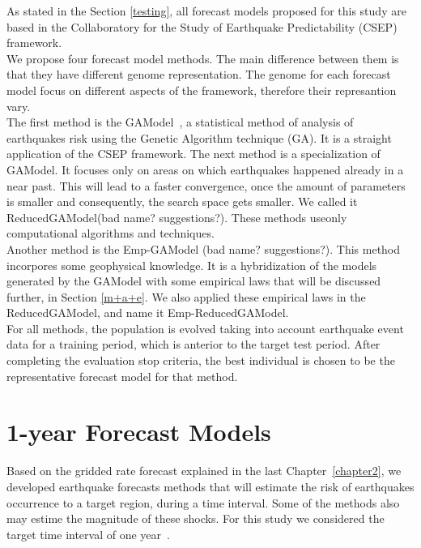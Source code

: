 As stated in the Section \ref{testing}, all forecast models proposed for this study are based in the Collaboratory for the Study of Earthquake Predictability (CSEP) framework.\\

We propose four forecast model methods. The main difference between them is that they have different genome representation. The genome for each forecast model focus on different aspects of the framework, therefore their represantion vary.\\

The first method is the GAModel~\cite{ecta14}, a statistical method of analysis of
earthquakes risk using the Genetic Algorithm technique (GA). It is a straight application of the CSEP framework. The next method is a specialization of GAModel. It focuses only on areas on which earthquakes happened already in a near past. This will lead to a faster convergence, once the amount of parameters is smaller and consequently, the search space gets smaller. We called it ReducedGAModel(bad name? suggestions?). These methods useonly computational algorithms and techniques.\\

Another method is the Emp-GAModel (bad name? suggestions?). This method incorpores some
geophysical knowledge. It is a hybridization of the models generated by the GAModel with some empirical laws that will be discussed further, in Section \ref{m+a+e}. We also applied these empirical laws in the ReducedGAModel, and name it Emp-ReducedGAModel.\\

For all methods, the population is evolved taking into account earthquake event data for a training period, which is anterior to the target test period. After completing the evaluation stop criteria, the best individual is chosen to be the representative forecast model for that method.\\

\section{1-year Forecast Models}\label{1year-model}
Based on the gridded rate forecast explained in the last Chapter~\ref{chapter2}, we developed earthquake forecasts methods that will estimate the risk of earthquakes occurrence to a target region, during a time interval. Some of the methods also may estime the magnitude of these shocks. For this study we considered the target time interval of one year~\cite{ecta14}.\\


